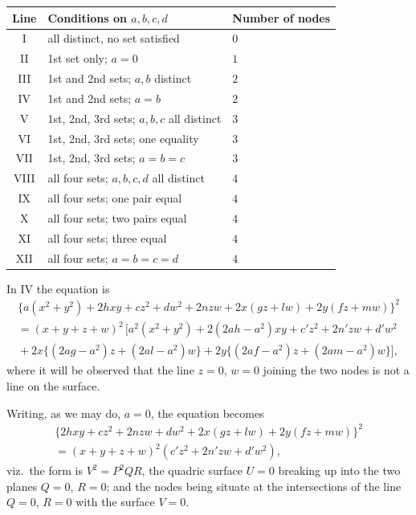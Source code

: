 \documentclass[11pt,a4paper]{article}
\begin{document}
\begin{center}
\begin{tabular}{c|l|l}
\hline
Line & Conditions on $a, b, c, d$ & Number of nodes \\
\hline
I    & all distinct, no set satisfied              & $0$ \\
II   & 1st set only; $a = 0$                       & $1$ \\
III  & 1st and 2nd sets; $a, b$ distinct           & $2$ \\
IV   & 1st and 2nd sets; $a = b$                   & $2$ \\
V    & 1st, 2nd, 3rd sets; $a, b, c$ all distinct  & $3$ \\
VI   & 1st, 2nd, 3rd sets; one equality            & $3$ \\
VII  & 1st, 2nd, 3rd sets; $a = b = c$             & $3$ \\
VIII & all four sets; $a, b, c, d$ all distinct    & $4$ \\
IX   & all four sets; one pair equal               & $4$ \\
X    & all four sets; two pairs equal              & $4$ \\
XI   & all four sets; three equal                  & $4$ \\
XII  & all four sets; $a = b = c = d$              & $4$ \\
\hline
\end{tabular}
\end{center}

\medskip

In IV the equation is
\begin{multline*}
\{a (x^{2} + y^{2}) + 2 h x y + c z^{2} + d w^{2} + 2 n z w
+ 2 x (g z + l w) + 2 y (f z + m w)\}^{2}\\
= (x + y + z + w)^{2}\,
[a^{2}(x^{2} + y^{2}) + 2(2 a h - a^{2}) x y + c' z^{2} + 2 n' z w + d' w^{2}\\
{}+ 2 x \{(2 a g - a^{2}) z + (2 a l - a^{2}) w\}
{}+ 2 y \{(2 a f - a^{2}) z + (2 a m - a^{2}) w\}], \tag{$AF$}
\end{multline*}
where it will be observed that the line $z = 0$, $w = 0$ joining the two
nodes is not a line on the surface.

Writing, as we may do, $a = 0$, the equation becomes
\begin{multline*}
\{2 h x y + c z^{2} + 2 n z w + d w^{2}
+ 2 x (g z + l w) + 2 y (f z + m w)\}^{2}\\
= (x + y + z + w)^{2} (c' z^{2} + 2 n' z w + d' w^{2}), \tag{$AF$}
\end{multline*}
viz.\ the form is $V^{2} = P^{2} Q R$, the quadric surface $U = 0$
breaking up into the two planes $Q = 0$, $R = 0$; and the nodes being
situate at the intersections of the line $Q = 0$, $R = 0$ with the
surface $V = 0$.
\end{document}
